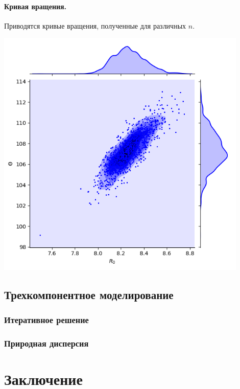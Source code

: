 \documentclass{matmex-diploma-custom}
\begin{document}
\pagebreak
\paragraph{Кривая вращения.} Приводятся кривые вращения, полученные для различных $n$. 

        \includegraphics[width=0.9\textwidth]{../../sources/scripts/out.png}
\pagebreak
\subsection{Трехкомпонентное моделирование}
\subsubsection{Итеративное решение}
\subsubsection{Природная дисперсия}
\section*{Заключение}
\setmonofont[Mapping=tex-text]{CMU Typewriter Text}
\pagebreak


\end{document}
